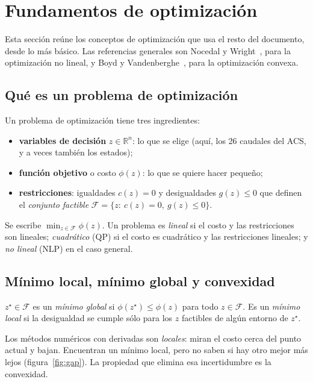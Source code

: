 \section{Fundamentos de optimización}\label{sec:optimizacion}
Esta sección reúne los conceptos de optimización que usa el resto del documento, desde lo más
básico. Las referencias generales son Nocedal y Wright~\cite{nocedal2006}, para la optimización
no lineal, y Boyd y Vandenberghe~\cite{boyd2004}, para la optimización convexa.

\subsection{Qué es un problema de optimización}
Un problema de optimización tiene tres ingredientes:
\begin{itemize}
  \item \textbf{variables de decisión} $z\in\mathbb R^n$: lo que se elige (aquí, los 26
        caudales del ACS, y a veces también los estados);
  \item \textbf{función objetivo} o costo $\phi(z)$: lo que se quiere hacer pequeño;
  \item \textbf{restricciones}: igualdades $c(z)=0$ y desigualdades $g(z)\le0$ que definen el
        \emph{conjunto factible} $\mathcal F=\{z:\ c(z)=0,\ g(z)\le0\}$.
\end{itemize}
Se escribe $\min_{z\in\mathcal F}\phi(z)$. Un problema es \emph{lineal} si el costo y las
restricciones son lineales; \emph{cuadrático} (QP) si el costo es cuadrático y las restricciones
lineales; y \emph{no lineal} (NLP) en el caso general.

\subsection{Mínimo local, mínimo global y convexidad}
\begin{definicion}
$z^\star\in\mathcal F$ es un \emph{mínimo global} si $\phi(z^\star)\le\phi(z)$ para todo
$z\in\mathcal F$. Es un \emph{mínimo local} si la desigualdad se cumple sólo para los $z$
factibles de algún entorno de $z^\star$.
\end{definicion}
\noindent Los métodos numéricos con derivadas son \emph{locales}: miran el costo cerca del
punto actual y bajan. Encuentran un mínimo local, pero no saben si hay otro mejor más lejos
(figura~\ref{fig:gap}). La propiedad que elimina esa incertidumbre es la convexidad.

